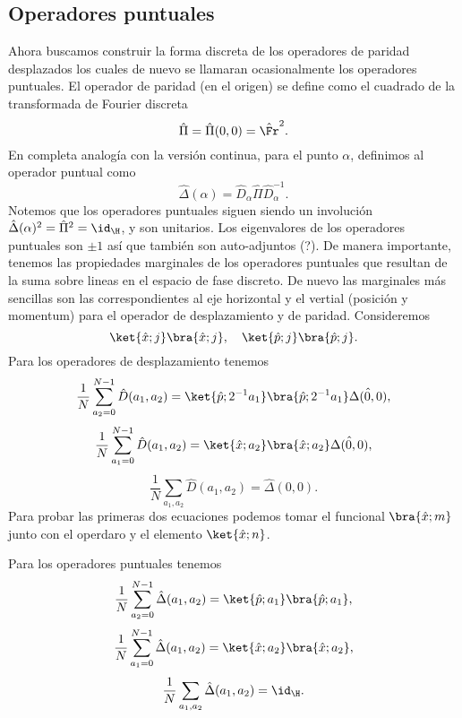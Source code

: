   \subsection{Operadores puntuales}

  Ahora buscamos construir la forma discreta de los
  operadores de paridad desplazados los cuales de nuevo se
  llamaran ocasionalmente los operadores puntuales. El
  operador de paridad (en el origen) se define como el
  cuadrado de la transformada de Fourier discreta
  \[
    \hat{\Pi}
    = \hat{\Pi}(0,0)
    = \hat{\Fr}^2.
  \] 
  En completa analogía con la versión continua, para el
  punto $\alpha$, definimos al operador puntual como
  \begin{equation}
    \hat{\Delta}(\alpha)
    = \hat{D}_\alpha \hat{\Pi} \hat{D}_{\alpha}^{-1}.
  \end{equation}
  Notemos que los operadores puntuales siguen siendo un
  involución $\hat{\Delta}(\alpha)^2 = \hat{\Pi}^2 =
  \id_{\H}$, y son unitarios. Los eigenvalores de los
  operadores puntuales son $\pm 1$ así que también son
  auto-adjuntos (?). De manera importante, tenemos las
  propiedades marginales de los operadores puntuales que
  resultan de la suma sobre lineas en el espacio de fase
  discreto. De nuevo las marginales más sencillas son las
  correspondientes al eje horizontal y el vertial (posición
  y momentum) para el operador de desplazamiento y de
  paridad. Consideremos
  \[
    \ket{\hat{x}; j}\bra{\hat{x}; j},
    \quad
    \ket{\hat{p}; j}\bra{\hat{p}; j}.
  \] 
  Para los operadores de desplazamiento tenemos
  \[
    \frac{1}{N} \sum_{a_2 = 0}^{N-1} \hat{D}(a_1,a_2)
    = \ket{\hat{p}; 2^{-1}a_1} \bra{\hat{p}; 2^{-1}a_1}
    \hat{\Delta(0,0)},
  \] 
  \[
    \frac{1}{N} \sum_{a_1=0}^{N-1} \hat{D}(a_1,a_2)
    = \ket{\hat{x}; a_2} \bra{\hat{x}; a_2}
    \hat{\Delta(0,0)},
  \] 
  \[
    \frac{1}{N} \sum_{a_1,a_2}^{} \hat{D}(a_1,a_2)
    = \hat{\Delta}(0,0).
  \]
  Para probar las primeras dos ecuaciones podemos tomar el
  funcional $\bra{\hat{x}; m}$ junto con el operdaro y el
  elemento $\ket{\hat{x}; n}$.

  Para los operadores puntuales tenemos
  \[
    \frac{1}{N} \sum_{a_2 = 0}^{N-1} \hat{\Delta}(a_1,a_2)
    = \ket{\hat{p}; a_1}\bra{\hat{p}; a_1},
  \] 
  \[
    \frac{1}{N} \sum_{a_1 = 0}^{N-1} \hat{\Delta}(a_1,a_2)
    = \ket{\hat{x}; a_2}\bra{\hat{x}; a_2},
  \] 
  \[
    \frac{1}{N} \sum_{a_1,a_2}^{} \hat{\Delta}(a_1,a_2) =
    \id_{\H}.
  \] 

